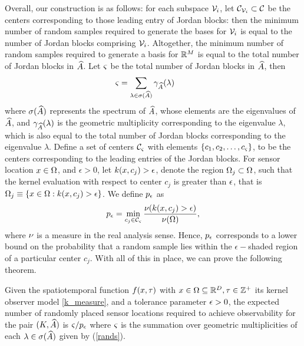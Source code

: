 Overall, our construction is as follows: for each subspace $ \mathcal{V}_i $, let $ \mathcal{C}_{\mathcal{V}_i} \subset \mathcal{C} $ be the centers corresponding to those leading entry of Jordan blocks: then the minimum number of random samples required to generate the bases for $ \mathcal{V}_i $ is equal to the number of Jordan blocks comprising $ \mathcal{V}_i $. Altogether, the minimum number of random samples required to generate a basis for $ \mathbb{R}^M $ is equal to the total number of Jordan blocks in $ \widehat{A} $. Let $ \varsigma $ be the total number of Jordan blocks in $ \widehat{A}  $, then
\begin{equation}\label{rands}
\rands = \sum_{\lambda \in \sigma(\dualopApprox)} \gamma_{\dualopApprox}(\lambda) \qquad %
\end{equation}
where $\sigma(\widehat{A}) $ represents the spectrum of $ \widehat{A} $, whose elements are the eigenvalues of $ \widehat{A} $, and $ \gamma_{\widehat{A}}(\lambda) $ is the geometric multiplicity corresponding to the eigenvalue $ \lambda $, which is also equal to the total number of Jordan blocks corresponding to the eigenvalue $ \lambda $. Define a set of centers $ \mathcal{C}_\varsigma $ with elements $ \{c_1, c_2,\dots, c_\varsigma\} $, to be the centers corresponding to the leading entries of  the Jordan blocks.
For sensor location $x\in\Omega$, and $ \epsilon > 0 $, let $k(x, c_j) > \epsilon$, denote the region $\Omega_j\subset\Omega$, such that the kernel evaluation with respect to center $c_j$ is greater than $\epsilon$, that is $ \Omega_j \equiv \{x\in \Omega:k(x, c_j) > \epsilon\} $. We define
$ p_{\epsilon} $ as
\begin{equation}\label{ppp}
p_{\e} = \min_{c_j \in \shCent_\rands} \frac{\measure(\kernel(x, c_j) > \epsilon)}{\measure(\dom)},
\end{equation}
where $\nu$ is a measure in the real analysis sense. Hence, $p_{\epsilon}$ corresponds to a lower bound on the probability that a random sample lies within the $ \epsilon-$shaded region of a particular center $ c_j$. With all of this in place, we can prove the following theorem. 
\begin{theorem}\label{thm:r1}
	Given the spatiotemporal function $ f(x,\tau) $ with $ x \in \Omega \subseteq  \mathbb{R}^{D}, \tau\in \mathbb{Z}^+  $ its kernel observer model \eqref{k_measure}, and a tolerance parameter $\epsilon>0$, the expected number of randomly placed sensor locations required to achieve observability for the pair $ (K,\widehat{A}) $ is $ \varsigma/{p_{\epsilon}} $ where $ \varsigma $ is the summation over geometric multiplicities of each $ \lambda \in \sigma(\widehat{A}) $  given by  (\ref{rands}).
\end{theorem}

